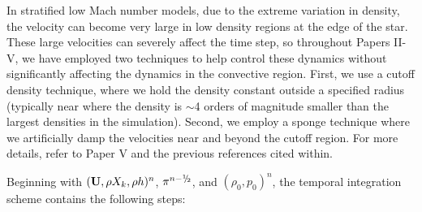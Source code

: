 In stratified low Mach number models, due to the extreme variation in density, the velocity can become very large in low density regions at the edge of the star.
These large velocities can severely affect the time step, so
throughout Papers II-V, we have employed two techniques to help control these dynamics without significantly 
affecting the dynamics in the convective region.
First, we use a cutoff density technique, where we hold the density constant outside a specified radius (typically near where the density is $\sim$4 orders of magnitude smaller than the largest densities in the simulation).
Second, we employ a sponge technique where we artificially damp the velocities near and beyond the cutoff region.
For more details, refer to Paper V and the previous references cited within.

Beginning with $({\bf{U}},\rho X_k,\rho h)^n$, $\pi^{n-\myhalf}$, and $(\rho_0,p_0)^n$,
the temporal integration scheme contains the following steps:
